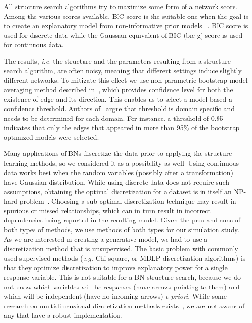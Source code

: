 \documentclass[smallextended]{svjour3}       %
\begin{document}
All structure search algorithms try to maximize some form of a network score. 
Among the various scores available, BIC score is the suitable one when 
the goal is to create an explanatory model from non-informative prior models
~\cite{shmueli2010explain,sober2002instrumentalism}.
BIC score is used for discrete data while the Gaussian 
equivalent of BIC (bic-g) score is used for continuous data.

The results, \emph{i.e.} the structure and the parameters resulting from a structure
search algorithm, are often noisy, meaning that
different settings induce slightly different networks. To mitigate
this effect we use non-parametric bootstrap model averaging method
described in~\cite{friedman1999data}, which provides confidence
level for both the existence of edge and its direction. This enables
us to select a model based a confidence threshold. Authors
of~\cite{friedman1999data} argue that threshold is domain specific
and needs to be determined for each domain. For instance, a threshold of 
 0.95 indicates that  only the edges that appeared in more than
 95\% of the bootstrap optimized models were selected. 
 
Many applications of BNs discretize the data prior to applying
the structure learning methods, so we considered it as a possibility as well.
Using continuous data works best
when the random variables (possibly after a transformation) 
have Gaussian distribution. While using
discrete data does not require such assumptions, obtaining the optimal
discretization for a dataset is in itself an NP-hard
problem~\cite{chlebus1998finding}. Choosing a
sub-optimal discretization technique may result in spurious or
missed relationships, which can in turn result in incorrect
dependencies being reported in the resulting model. Given the pros
and cons of both types of methods, we use methods of both types for
our simulation study. As we are interested in creating a generative model, we had to
use a discretization method that is unsupervised. The basic problem
with commonly used supervised methods (\textit{e.g.} Chi-square, or
MDLP discretization algorithms) is that they optimize
discretization to improve explanatory power for 
a single response variable. This is not suitable for a 
BN structure search, because we do
not know  which variables will be responses (have arrows
pointing to them) and which will be independent (have no incoming
arrows) {\em a-priori}. While some research on multidimensional
discretization methods exists~\cite{perez2006supervised},
we are not aware of any that have a robust implementation.
\end{document}
